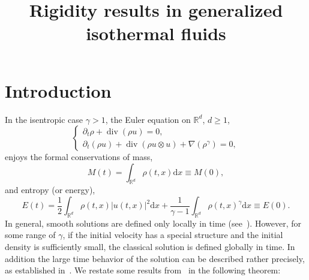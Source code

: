 \documentclass[AHL,Unicode,longabstracts]{cedram}
\title[Rigidity in isothermal fluids]{Rigidity results in generalized isothermal fluids}
\author[\initial{R.} \lastname{Carles}]{\firstname{R\'emi} \lastname{Carles}}
\author[\initial{K.} \lastname{Carrapatoso}]{\firstname{Kleber} \lastname{Carrapatoso}}
\author[\initial{M.} \lastname{Hillairet}]{\firstname{Matthieu} \lastname{Hillairet}}
\DeclareMathOperator{\DIV}{div}
\newcommand*\R{\mathbb{R}}
\newcommand*\dd {\mathrm{d}}
\newcommand*\<{\left\langle}
\renewcommand*\>{\right\rangle}
\renewcommand*\ge{\geqslant}
\begin{document}
\enlargethispage{12pt}
\maketitle

\section{Introduction}\label{sec:intro}

In the isentropic case $\gamma>1$, the Euler equation on $\R^d$, $d\ge 1$,
\begin{equation}\label{eq:euler-isent}
\begin{cases}
\partial_t \rho+\DIV\left(\rho u\right)=0,\\
\partial_t (\rho u) +\DIV(\rho u\otimes u)+\nabla
\left(\rho^\gamma\right)= 0,
\end{cases}
\end{equation}
enjoys the formal conservations of mass,
\begin{equation*}
M(t) =\int_{\R^d}\rho(t,x)\dd x\equiv M(0),
\end{equation*}
and entropy (or energy),
\begin{equation*}
E(t) = \frac{1}{2}\int_{\R^d} \rho (t,x) |u(t,x)|^2 \dd x+\frac{1}{\gamma-1}\int_{\R^d}\rho(t,x)^\gamma
\dd x \equiv E(0).
\end{equation*}
In general, smooth solutions are defined only locally in time (see~\cite{MUK86,JYC90,Xin98}). However, for some range of $\gamma$, if the initial velocity has a special structure and the initial density is sufficiently small, the classical solution is defined globally in time. In addition the large time behavior of the solution can be described rather precisely, as established in~\cite{Serre97}. We restate some results from~\cite{Serre97} in the following theorem:
\end{document}
